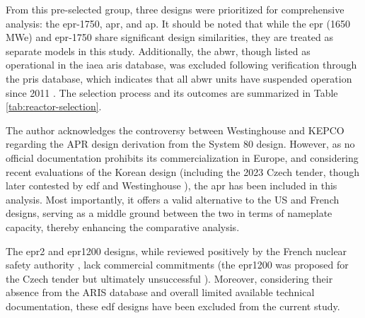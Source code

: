 From this pre-selected group, three designs were prioritized for comprehensive analysis: the \gls{epr}-1750, \gls{apr}, and \gls{ap}. It should be noted that while the \gls{epr} (1650 MWe) and \gls{epr}-1750 share significant design similarities, they are treated as separate models in this study. Additionally, the \gls{abwr}, though listed as operational in the \gls{iaea} \gls{aris} database, was excluded following verification through the \gls{pris} database, which indicates that all \gls{abwr} units have suspended operation since 2011 \cite{IAEA_PRIS_2025}. The selection process and its outcomes are summarized in Table \ref{tab:reactor-selection}.

The author acknowledges the controversy between Westinghouse and KEPCO regarding the APR design derivation from the System 80 design. However, as no official documentation prohibits its commercialization in Europe, and considering recent evaluations of the Korean design (including the 2023 Czech tender, though later contested by \gls{edf} and Westinghouse \cite{WNN_Czech_Nuclear_Appeal_2024}), the \gls{apr} has been included in this analysis. Most importantly, it offers a valid alternative to the US and French designs, serving as a middle ground between the two in terms of nameplate capacity, thereby enhancing the comparative analysis.

The \gls{epr}2 and \gls{epr}1200 designs, while reviewed positively by the French nuclear safety authority \cite{WNN_EPR1200_Safety_2023}, lack commercial commitments (the \gls{epr}1200 was proposed for the Czech tender but ultimately unsuccessful \cite{WNN_Czech_Nuclear_Appeal_2024}). Moreover, considering their absence from the ARIS database and overall limited available technical documentation, these \gls{edf} designs have been excluded from the current study.


